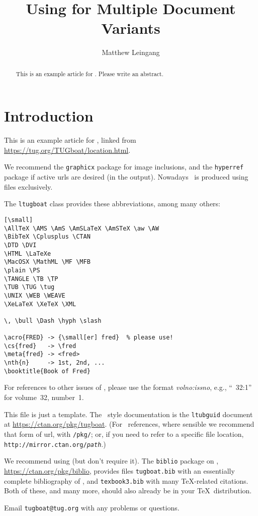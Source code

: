 \documentclass{ltugboat}
\title{Using \docstrip{} for Multiple Document Variants}
\author{Matthew Leingang}
\begin{document}
\maketitle

\begin{abstract}
This is an example article for \TUB{}.
Please write an abstract.
\end{abstract}

\section{Introduction}

This is an example article for \TUB, linked from
\url{https://tug.org/TUGboat/location.html}.

We recommend the \texttt{graphicx} package for image inclusions, and the
\texttt{hyperref} package if active urls are desired (in the 
output).  Nowadays \TUB\ is produced using  files exclusively.

The \texttt{ltugboat} class provides these abbreviations, among many others:

\begin{verbatim}[\small]
\AllTeX \AMS \AmS \AmSLaTeX \AmSTeX \aw \AW
\BibTeX \Cplusplus \CTAN
\DTD \DVI
\HTML \LaTeXe
\MacOSX \MathML \MF \MFB
\plain \PS
\TANGLE \TB \TP
\TUB \TUG \tug
\UNIX \WEB \WEAVE
\XeLaTeX \XeTeX \XML

\, \bull \Dash \hyph \slash

\acro{FRED} -> {\small[er] fred}  % please use!
\cs{fred}   -> \fred
\meta{fred} -> <fred>
\nth{n}     -> 1st, 2nd, ...
\booktitle{Book of Fred}
\end{verbatim}

For references to other issues of \TUB, please use the format
\textsl{volno:issno}, e.g., ``\TUB\ 32:1'' for volume~32, number~1.

This file is just a template.  The \TUB\ style documentation is the
\texttt{ltubguid} document at \url{https://ctan.org/pkg/tugboat}.  (For
\CTAN\ references, where sensible we recommend that form of url, with
\texttt{/pkg/}; or, if you need to refer to a specific file location,
\texttt{http://mirror.ctan.org/\textsl{path}}.)

We recommend using \BibTeX (but don't require it).  The \texttt{biblio}
package on \CTAN, \url{https://ctan.org/pkg/biblio}, provides files
\texttt{tugboat.bib} with an essentially complete bibliography of \TUB,
and \texttt{texbook3.bib} with many \TeX-related citations.  Both of these,
and many more, should also already be in your \TeX\ distribution.

Email \verb|tugboat@tug.org| with any problems or questions.

\nocite{book-minimal}      %

\makesignature
\end{document}
